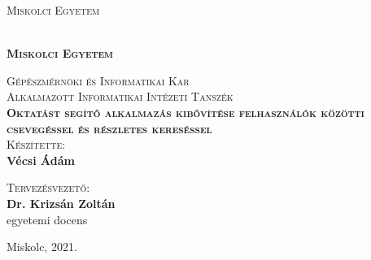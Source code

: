 \pagestyle{empty} %
\newcommand{\nev}{Vécsi Ádám}
\newcommand{\neptun}{IZBTF9}
\newcommand{\cim}{Oktatást segítő alkalmazás kibővítése felhasználók közötti csevegéssel és részletes kereséssel}

\begin{center}
	\textsc{\Large{Miskolci Egyetem}}
	
{\large
	\begin{center}
		\\
		\textbf{\textsc{Miskolci Egyetem}}
\end{center}}
	
	\textsc{\Large{Gépészmérnöki és Informatikai Kar}}\\	
	\vspace{5mm}	
	\textsc{\Large{Alkalmazott Informatikai Intézeti Tanszék}}\\
	
	\vspace{14mm}	
	\textsc{\Large{\textbf{\cim}}}\\
	
	\vspace{10mm}
	\textsc{Készítette:}\\
	\textbf{\nev}\\
	\vspace{20mm}
	
	\textsc{Tervezésvezető:}\\
	\textbf{Dr. Krizsán Zoltán}\\
	egyetemi docens\\
	\vspace{50mm}
	
	\vspace{20mm} Miskolc, 2021.	
	
\end{center}

\newpage
